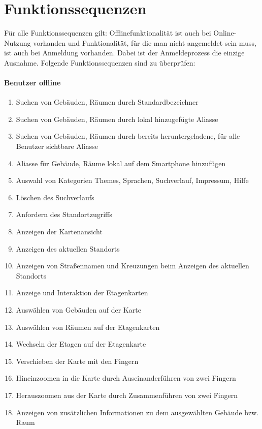 \section{Funktionssequenzen}

Für alle Funktionssequenzen gilt:
Offlinefunktionalität ist auch bei Online-Nutzung vorhanden und Funktionalität, für die man nicht angemeldet sein muss, ist auch bei Anmeldung vorhanden. Dabei ist der Anmeldeprozess die einzige Ausnahme.
Folgende Funktionssequenzen sind zu überprüfen:

\paragraph{Benutzer offline}
\begin{enumerate}[label=\textbf{/T\arabic*0/}, align=left]
	\item Suchen von Gebäuden, Räumen durch Standardbezeichner
	\item Suchen von Gebäuden, Räumen durch lokal hinzugefügte Aliasse
	\item Suchen von Gebäuden, Räumen durch bereits heruntergeladene, für alle Benutzer sichtbare Aliasse
	\item Aliasse für Gebäude, Räume lokal auf dem Smartphone hinzufügen
	\item Auswahl von Kategorien Themes, Sprachen, Suchverlauf, Impressum, Hilfe
	\item Löschen des Suchverlaufs
	\item Anfordern des Standortzugriffs
	\item Anzeigen der Kartenansicht
	\item Anzeigen des aktuellen Standorts
	\item Anzeigen von Straßennamen und Kreuzungen beim Anzeigen des aktuellen Standorts
	\item Anzeige und Interaktion der Etagenkarten
	\item Auswählen von Gebäuden auf der Karte
	\item Auswählen von Räumen auf der Etagenkarten
	\item Wechseln der Etagen auf der Etagenkarte
	\item Verschieben der Karte mit den Fingern
	\item Hineinzoomen in die Karte durch Auseinanderführen von zwei Fingern
	\item Herauszoomen aus der Karte durch Zusammenführen von zwei Fingern
	\item Anzeigen von zusätzlichen Informationen zu dem ausgewählten Gebäude bzw. Raum
\end{enumerate}


